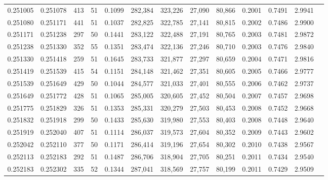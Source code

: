 \begin{tabular}{rrrrrrrrrrrrr}
0.251005 & 0.251078 &   413 &  51 &                                     0.1099 & 282,384 & 323,226 &  27,090 &  80,866 & 0.2001 & 0.7491 & 2.9941 \\
0.251080 & 0.251171 &   441 &  51 &                                     0.1037 & 282,825 & 322,785 &  27,141 &  80,815 & 0.2002 & 0.7486 & 2.9900 \\
0.251171 & 0.251238 &   297 &  50 &                                     0.1441 & 283,122 & 322,488 &  27,191 &  80,765 & 0.2003 & 0.7481 & 2.9872 \\
0.251238 & 0.251330 &   352 &  55 &                                     0.1351 & 283,474 & 322,136 &  27,246 &  80,710 & 0.2003 & 0.7476 & 2.9840 \\
0.251330 & 0.251418 &   259 &  51 &                                     0.1645 & 283,733 & 321,877 &  27,297 &  80,659 & 0.2004 & 0.7471 & 2.9816 \\
0.251419 & 0.251539 &   415 &  54 &                                     0.1151 & 284,148 & 321,462 &  27,351 &  80,605 & 0.2005 & 0.7466 & 2.9777 \\
0.251539 & 0.251649 &   429 &  50 &                                     0.1044 & 284,577 & 321,033 &  27,401 &  80,555 & 0.2006 & 0.7462 & 2.9737 \\
0.251649 & 0.251772 &   428 &  51 &                                     0.1065 & 285,005 & 320,605 &  27,452 &  80,504 & 0.2007 & 0.7457 & 2.9698 \\
0.251775 & 0.251829 &   326 &  51 &                                     0.1353 & 285,331 & 320,279 &  27,503 &  80,453 & 0.2008 & 0.7452 & 2.9668 \\
0.251832 & 0.251918 &   299 &  50 &                                     0.1433 & 285,630 & 319,980 &  27,553 &  80,403 & 0.2008 & 0.7448 & 2.9640 \\
0.251919 & 0.252040 &   407 &  51 &                                     0.1114 & 286,037 & 319,573 &  27,604 &  80,352 & 0.2009 & 0.7443 & 2.9602 \\
0.252042 & 0.252110 &   377 &  50 &                                     0.1171 & 286,414 & 319,196 &  27,654 &  80,302 & 0.2010 & 0.7438 & 2.9567 \\
0.252113 & 0.252183 &   292 &  51 &                                     0.1487 & 286,706 & 318,904 &  27,705 &  80,251 & 0.2011 & 0.7434 & 2.9540 \\
0.252183 & 0.252302 &   335 &  52 &                                     0.1344 & 287,041 & 318,569 &  27,757 &  80,199 & 0.2011 & 0.7429 & 2.9509 \\

\end{tabular}
